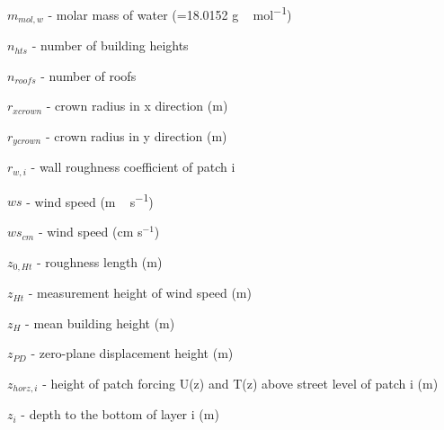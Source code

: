 {\begin{description}
\item $m_{mol,w}$  -  molar mass of water (=18.0152 \unit{g\,mol^{-1}}) 
\item $n _{hts}$  -  number of building heights 
\item $n _{roofs}$  -  number of roofs 
\item $r _{xcrown}$  -  crown radius in x direction (\unit{m}) 
\item $r _{ycrown}$  -  crown radius in y direction (\unit{m}) 
\item $r_{w,i}$  -  wall roughness coefficient of patch i 
\item $ws$  -  wind speed (\unit{m\,s^{-1}}) 
\item $ws_{cm}$  -  wind speed (cm s$^{-1}$) 
\item $z_{0,Ht}$  -  roughness length (\unit{m}) 
\item $z_{Ht}$  -  measurement height of wind speed (\unit{m}) 
\item $z_{H}$  -  mean building height (\unit{m}) 
\item $z_{PD}$  -   zero-plane displacement height (\unit{m}) 
\item $z_{horz,i}$  -  height of patch forcing U(z) and T(z) above street level of patch i (\unit{m}) 
\item $z_{i}$  -  depth to the bottom of layer i (\unit{m}) 


\end{description}
}

